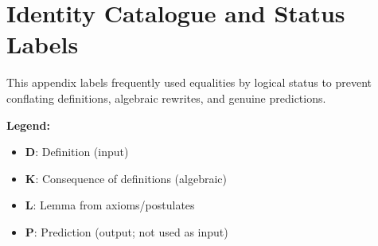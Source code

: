 \section{Identity Catalogue and Status Labels}
\label{app:identities}

This appendix labels frequently used equalities by logical status to prevent conflating definitions, algebraic rewrites, and genuine predictions.

\textbf{Legend:}
\begin{itemize}[leftmargin=1.5em, topsep=2pt, itemsep=1pt]
    \item \textbf{D}: Definition (input)
    \item \textbf{K}: Consequence of definitions (algebraic)
    \item \textbf{L}: Lemma from axioms/postulates
    \item \textbf{P}: Prediction (output; not used as input)
\end{itemize}

